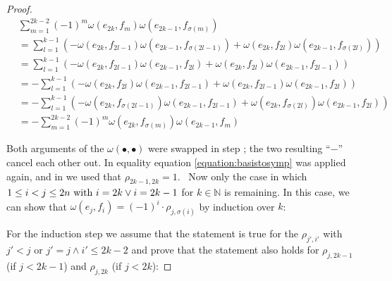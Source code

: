 \documentclass[../SymplecticSimplices.tex]{subfiles}
\begin{document}
\begin{proof}
  \begin{equation*}
    \begin{split}
      & \sum \limits _{m=1}^{2k-2} \left( -1 \right)^{m} \omega \left( e_{2k}, f_m \right) \omega \left( e_{2k-1}, f_{\sigma \left( m \right)} \right) \\
      & = \sum \limits _{l=1}^{k-1} \left( - \omega \left( e_{2k}, f_{2l-1} \right) \omega \left( e_{2k-1}, f_{\sigma \left( {2l-1} \right)} \right) + \omega \left( e_{2k}, f_{2l} \right) \omega \left( e_{2k-1}, f_{\sigma \left( {2l} \right)} \right) \right) \\
      & = \sum \limits _{l=1}^{k-1} \left( - \omega \left( e_{2k}, f_{2l-1} \right) \omega \left( e_{2k-1}, f_{2l} \right) + \omega \left( e_{2k}, f_{2l} \right) \omega \left( e_{2k-1}, f_{2l-1} \right) \right) \\
      & = - \sum \limits _{l=1}^{k-1} \left( - \omega \left( e_{2k}, f_{2l} \right) \omega \left( e_{2k-1}, f_{2l-1} \right) + \omega \left( e_{2k}, f_{2l-1} \right) \omega \left( e_{2k-1}, f_{2l} \right) \right) \\
      & = - \sum \limits _{l=1}^{k-1} \left( - \omega \left( e_{2k}, f_{\sigma \left( 2l-1 \right)} \right) \omega \left( e_{2k-1}, f_{2l-1} \right) + \omega \left( e_{2k}, f_{\sigma \left( 2l \right)} \right) \omega \left( e_{2k-1}, f_{2l} \right) \right) \\
      & = - \sum \limits _{m=1}^{2k-2} \left( -1 \right)^{m} \omega \left( e_{2k}, f_{\sigma \left( m \right)} \right) \omega \left( e_{2k-1}, f_m \right)
    \end{split}
  \end{equation*}

  Both arguments of the \( \omega \left( \bullet, \bullet \right) \) were swapped in step ; the two resulting ``\( - \)'' cancel each other out. In equality  equation \eqref{equation:basistosymp} was applied again, and in  we used that \( \rho_{2k-1, 2k} = 1 \).
\
  Now only the case in which \( 1 \leq i < j \leq 2n \textnormal { with } i = 2k \lor i = 2k - 1 \) for \( k \in \mathbb{N} \) is remaining. In this case, we can show that \( \omega \left( e_j, f_i \right) = \left( -1 \right)^i \cdot \rho_{j, \sigma \left( i \right)} \) by induction over \( k \):
  
  For the induction step we assume that the statement is true for the \( \rho_{j', i'} \) with \( j' < j \) or \( j' = j \land i' \leq 2k-2 \) and prove that the statement also holds for \( \rho_{j, 2k - 1} \) (if \( j < 2k-1 \)) and \( \rho_{j, 2k} \) (if \( j < 2k \)):


\end{proof}
\end{document}
